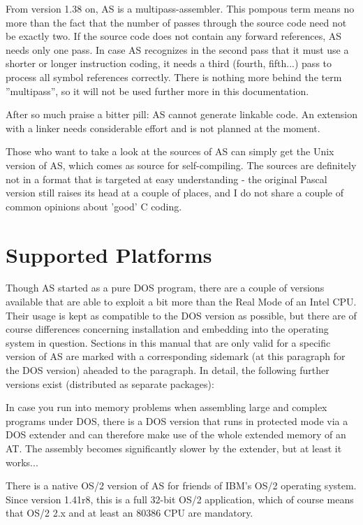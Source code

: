 \documentclass[12pt,twoside]{report}
\begin{document}
From version 1.38 on, AS is a multipass-assembler.  This pompous term
means no more than the fact that the number of passes through the
source code need not be exactly two. If the source code does not
contain any forward references, AS needs only one pass.  In case AS
recognizes in the second pass that it must use a shorter or longer
instruction coding, it needs a third (fourth, fifth...) pass to
process all symbol references correctly. There is nothing more behind
the term ''multipass'', so it will not be used further more in this
documentation.

After so much praise a bitter pill: AS cannot generate linkable code. 
An extension with a linker needs considerable effort and is not planned 
at the moment.

Those who want to take a look at the sources of AS can simply get the 
Unix version of AS, which comes as source for self-compiling.  The sources
are definitely not in a format that is targeted at easy understanding -
the original Pascal version still raises its head at a couple of places,
and I do not share a couple of common opinions about 'good' C coding.


\section{Supported Platforms}

Though AS started as a pure DOS  program, there are a
couple of versions available that are able to exploit a bit more than the
Real Mode of an Intel CPU.  Their usage is kept as compatible to the DOS
version as possible, but there are of course differences concerning
installation and embedding into the operating system in question. 
Sections in this manual that are only valid for a specific version of AS
are marked with a corresponding sidemark (at this paragraph for the DOS
version) aheaded to the paragraph.  In detail, the following further
versions exist (distributed as separate packages):

In case you run into memory problems when assembling
large and complex programs under DOS, there is a DOS version that runs in
protected mode via a DOS extender and can therefore make use of the whole
extended memory of an AT.  The assembly becomes significantly slower by
the extender, but at least it works...

There is a native OS/2  version of AS for friends of
IBM's OS/2 operating system.  Since version 1.41r8, this is a full 32-bit
OS/2 application, which of course means that OS/2 2.x and at least an
80386 CPU are mandatory.  
\end{document}
